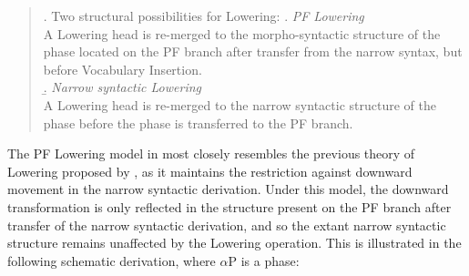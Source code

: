 \singlespacing
\begin{quote}
\begin{minipage}{5in}
\ex. Two structural possibilities for Lowering:
\a. {\it PF Lowering}\\
A Lowering head is re-merged to the morpho-syntactic structure of the phase located on the PF branch after transfer from the narrow syntax, but before Vocabulary Insertion.\\
\b. {\it Narrow syntactic Lowering}\\
A Lowering head is re-merged to the narrow syntactic structure of the phase before the phase is transferred to the PF branch.

\end{minipage}
\end{quote}
\onehalfspacing
The PF Lowering model in \Last[a] most closely resembles the previous theory of Lowering proposed by \citet{embick_noyer2001}, as it maintains the restriction against downward movement in the narrow syntactic derivation. Under this model, the downward transformation is only reflected in the structure present on the PF branch after transfer of the narrow syntactic derivation, and so the extant narrow syntactic structure remains unaffected by the Lowering operation. This is illustrated in the following schematic derivation, where $\alpha$P is a phase:

